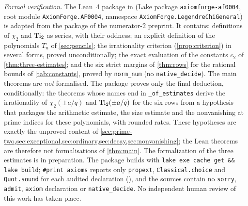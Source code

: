\emph{Formal verification.} The Lean~4 package in  (Lake package
\texttt{axiomforge-af0004}, root module \texttt{AxiomForge.AF0004}, namespace
\texttt{AxiomForge.LegendreChiGeneral}) is adapted from the package of the numerator-$2$
preprint. It contains: definitions of $\chi_2$ and $\operatorname{Ti}_2$ as series, with their oddness; an
explicit definition of the polynomials $T_n$ of \cref{sec:pencils}; the irrationality
criterion (\cref{prop:criterion}) in several forms, proved unconditionally; the exact evaluation of
the constants $c_2$ of \cref{thm:three-estimates}; and the six strict margins of \cref{thm:rows}
for the rational bounds of \cref{tab:constants}, proved by \texttt{norm\_num} (no
\texttt{native\_decide}). The main theorems are \emph{not} formalised. The package proves only the
final deduction, conditionally: the theorems whose names end in \texttt{\_of\_estimates} derive the
irrationality of $\chi_2(\pm a/q)$ and $\operatorname{Ti}_2(\pm a/q)$ for the six rows from a hypothesis that
packages the arithmetic estimate, the size estimate and the nonvanishing at prime indices for these
polynomials, with rounded rates. These hypotheses are exactly the unproved content of
\cref{sec:prime-two,sec:exceptional,sec:ordinary,sec:decay,sec:nonvanishing}; the Lean theorems are
therefore not formalisations of \cref{thm:main}. The formalization of the three estimates is in
preparation. The package builds with \texttt{lake exe cache get \&\& lake build};
\texttt{\#print axioms} reports only \texttt{propext}, \texttt{Classical.choice} and
\texttt{Quot.sound} for each audited declaration (), and the sources contain
no \texttt{sorry}, \texttt{admit}, \texttt{axiom} declaration or \texttt{native\_decide}. No
independent human review of this work has taken place.
